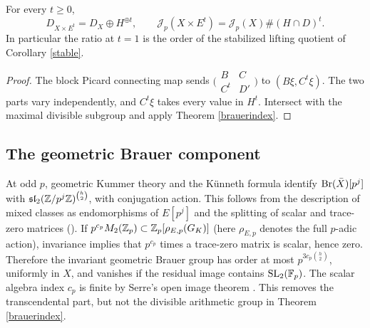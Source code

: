 \documentclass[11pt,a4paper]{article}
\theoremstyle{remark}\newtheorem{remark}[theorem]{Remark}
\begin{document}
\begin{corollary}\label{ratio}
For every $t\ge0$,
\[
 D_{X\times E^t}=D_X\oplus H^{\oplus t},\qquad
 \mathcal J_p(X\times E^t)=\mathcal J_p(X)\#(H\cap D)^t.
\]
In particular the ratio at $t=1$ is the order of the stabilized lifting quotient of Corollary \ref{stable}.
\end{corollary}
\begin{proof}
The block Picard connecting map sends $\bigl(\begin{smallmatrix}B&C\\C^t&D'\end{smallmatrix}\bigr)$ to $(B\xi,C^t\xi)$. The two parts vary independently, and $C^t\xi$ takes every value in $H^t$. Intersect with the maximal divisible subgroup and apply Theorem \ref{brauerindex}.
\end{proof}
\subsection{The geometric Brauer component}
At odd $p$, geometric Kummer theory and the K\"unneth formula identify $\operatorname{Br}(\bar X)[p^j]$ with $\mathfrak{sl}_2(\mathbb Z/p^j\mathbb Z)^{\binom h2}$, with conjugation action. This follows from the description of mixed classes as endomorphisms of $E[p^j]$ and the splitting of scalar and trace-zero matrices (\cite{sz1,sz2}). If $p^{c_p}M_2(\mathbb Z_p)\subset\mathbb Z_p[\rho_{E,p}(G_K)]$ (here $\rho_{E,p}$ denotes the full $p$-adic action), invariance implies that $p^{c_p}$ times a trace-zero matrix is scalar, hence zero. Therefore the invariant geometric Brauer group has order at most $p^{3c_p\binom h2}$, uniformly in $X$, and vanishes if the residual image contains $\operatorname{SL}_2(\mathbb F_p)$. The scalar algebra index $c_p$ is finite by Serre's open image theorem \cite{serre}. This removes the transcendental part, but not the divisible arithmetic group in Theorem \ref{brauerindex}.
\end{document}
